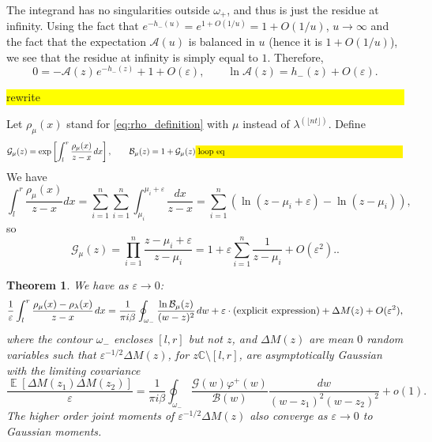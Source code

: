 \documentclass[letterpaper,11pt,oneside,reqno]{article}
\numberwithin{equation}{section}
\newcommand{\ssp}{\hspace{1pt}}
\newtheorem{theorem}[proposition]{Theorem}
\theoremstyle{definition}
\begin{document}
The integrand has no singularities outside $\omega_+$, and thus is just the residue at 
infinity.
Using the fact that 
$e^{-h_-(u)}=e^{1+O(1/u)}=1+O(1/u)$, $u\to\infty$
and the fact that the expectation $\mathcal{A}(u)$ is balanced in $u$
(hence it is $1+O(1/u)$), 
we see that 
the residue at infinity is simply equal to $1$.
Therefore, 
\begin{equation*}
	0=-\mathcal{A}(z)\ssp e^{-h_-(z)}+1+O(\varepsilon),\qquad 
	\ln \mathcal{A}(z)=h_-(z)+O(\varepsilon).
\end{equation*}







\newpage
\colorbox{yellow}{\parbox{.7\textwidth}{rewrite}}

Let $\rho_\mu(x)$ stand for \eqref{eq:rho_definition} with $\mu$ instead of $\lambda^{(\lfloor nt \rfloor )}$. Define
\begin{equation*}
	\mathcal{G}_\mu(z)=\exp\left[ \int_{l}^{r} \frac{\rho_\mu(x)}{z-x}\ssp dx\right],
	\qquad 
	\mathcal{B}_\mu(z)=1+\mathcal{G}_\mu(z)\colorbox{yellow}{\parbox{.7\textwidth}{loop eq}}
\end{equation*}
We have
\begin{equation*}
	\int_l^r\frac{\rho_\mu(x)}{z-x}dx=\sum_{i=1}^n
	\sum_{i=1}^n\int_{\mu_i}^{\mu_i+\varepsilon}\frac{dx}{z-x}=
	\sum_{i=1}^n\left( \ln(z-\mu_i+\varepsilon)-\ln(z-\mu_i) \right), 
\end{equation*}
so
\begin{equation*}
	\mathcal{G}_\mu(z)=\prod_{i=1}^{n}\frac{z-\mu_i+\varepsilon}{z-\mu_i}=
	1+\varepsilon\sum_{i=1}^{n}\frac{1}{z-\mu_i}+O(\varepsilon^2)..
\end{equation*}

\begin{theorem}
	We have as $\varepsilon\to0$:
	\begin{equation*}
		\frac{1}{\varepsilon}\int_l^r \frac{\rho_\mu(x)-\rho_\lambda(x)}{z-x}\ssp dx
		=
		\frac{1}{\pi i \beta}\oint_{\omega_-} \frac{\ln \mathcal{B}_\mu(z)}{(w-z)^2}\ssp dw
		+
		\varepsilon\cdot\left( \textnormal{explicit expression} \right)
		+\Delta M(z)+O(\varepsilon^2),
	\end{equation*}
	where the contour $\omega_-$ encloses $[l,r]$ but not $z$,
	and $\Delta M(z)$ are mean $0$ random variables such that $\varepsilon^{-1/2}\Delta M(z)$,
	for $z\mathbb{C}\setminus [l,r]$, are asymptotically Gaussian with the limiting covariance
	\begin{equation*}
		\frac{\operatorname{\mathbb{E}}\left[ 
		\Delta M(z_1)\Delta M(z_2) \right]}{\varepsilon}
			=
		\frac{1}{\pi i \beta}\oint_{\omega_-}
		\frac{\mathcal{G}(w)\varphi^+(w)}{\mathcal{B}(w)}\frac{dw}{(w-z_1)^2(w-z_2)^2}+o(1).
	\end{equation*}
	The higher order joint moments of $\varepsilon^{-1/2}\Delta M(z)$ 
	also converge as $\varepsilon\to0$ to Gaussian moments.
\end{theorem}
\end{document}
